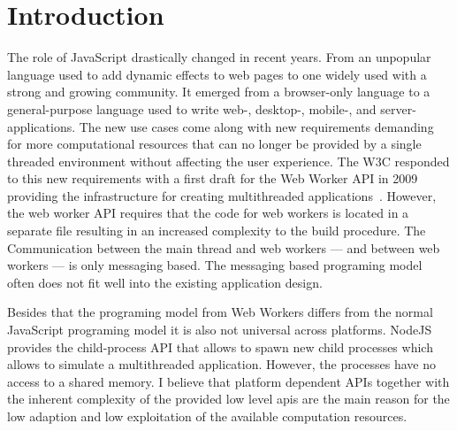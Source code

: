 \section{Introduction}\label{sec:introduction}
The role of JavaScript drastically changed in recent years. From an unpopular language used to add dynamic effects to web pages to one widely used with a strong and growing community. It emerged from a browser-only language to a general-purpose language used to write web-, desktop-, mobile-, and server-applications. The new use cases come along with new requirements demanding for more computational resources that can no longer be provided by a single threaded environment without affecting the user experience. The W3C responded to this new requirements with a first draft for the Web Worker API in 2009 providing the infrastructure for creating multithreaded applications~\cite{IanHickson2015}. However, the web worker API requires that the code for web workers is located in a separate file resulting in an increased complexity to the build procedure. The Communication between the main thread and web workers --- and between web workers --- is only messaging based. The messaging based programing model often does not fit well into the existing application design. 

Besides that the programing model from Web Workers differs from the normal JavaScript programing model it is also not universal across platforms. NodeJS provides the child-process API that allows to spawn new child processes which allows to simulate a multithreaded application. However, the processes have no access to a shared memory. I believe that platform dependent APIs together with the inherent complexity of the provided low level apis are the main reason for the low adaption and low exploitation of the available computation resources.